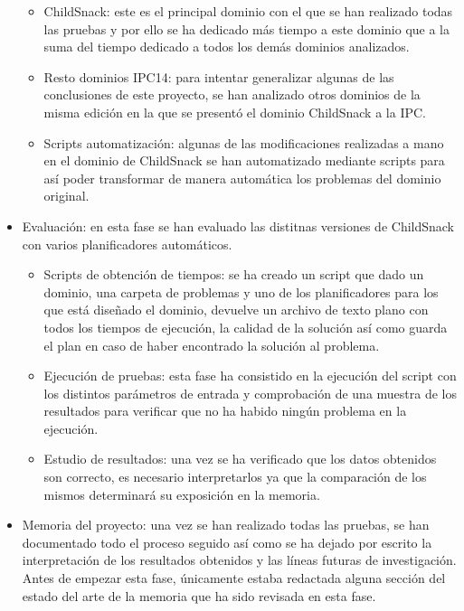 \documentclass{article}
\begin{document}
\begin{itemize}
    \begin{itemize}
        \item ChildSnack: este es el principal dominio con el que se han realizado todas las pruebas y por ello se ha dedicado más tiempo a este dominio que a la suma del tiempo dedicado a todos los demás dominios analizados.
        \item Resto dominios IPC14: para intentar generalizar algunas de las conclusiones de este proyecto, se han analizado otros dominios de la misma edición en la que se presentó el dominio ChildSnack a la IPC.
        \item Scripts automatización: algunas de las modificaciones realizadas a mano en el dominio de ChildSnack se han automatizado mediante scripts para así poder transformar de manera automática los problemas del dominio original.
    \end{itemize}
    
    \item Evaluación: en esta fase se han evaluado las distitnas versiones de ChildSnack con varios planificadores automáticos.
    
    \begin{itemize}
        \item Scripts de obtención de tiempos: se ha creado un script que dado un dominio, una carpeta de problemas y uno de los planificadores para los que está diseñado el dominio, devuelve un archivo de texto plano con todos los tiempos de ejecución, la calidad de la solución así como guarda el plan en caso de haber encontrado la solución al problema.
        \item Ejecución de pruebas: esta fase ha consistido en la ejecución del script con los distintos parámetros de entrada y comprobación de una muestra de los resultados para verificar que no ha habido ningún problema en la ejecución.
        \item Estudio de resultados: una vez se ha verificado que los datos obtenidos son correcto, es necesario interpretarlos ya que la comparación de los mismos determinará su exposición en la memoria.
    \end{itemize}
    
    \item Memoria del proyecto: una vez se han realizado todas las pruebas, se han documentado todo el proceso seguido así como se ha dejado por escrito la interpretación de los resultados obtenidos y las líneas futuras de investigación. Antes de empezar esta fase, únicamente estaba redactada alguna sección del estado del arte de la memoria que ha sido revisada en esta fase.
    

\end{itemize}
\end{document}
